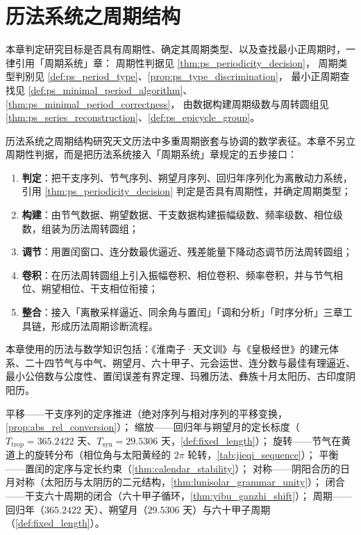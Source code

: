 \chapter{历法系统之周期结构}
\label{chap:calendar-periodic}

\begin{remark}[本章目标的周期性判定（引用）]\label{rem:calendar_ps_hook}
本章判定研究目标是否具有周期性、确定其周期类型、以及查找最小正周期时，一律引用「周期系统」章：
周期性判据见 \cref{thm:ps_periodicity_decision}，
周期类型判别见 \cref{def:ps_period_type}、\cref{prop:ps_type_discrimination}，
最小正周期查找见 \cref{def:ps_minimal_period_algorithm}、\cref{thm:ps_minimal_period_correctness}，
由数据构建周期级数与周转圆组见 \cref{thm:ps_series_reconstruction}、\cref{def:ps_epicycle_group}。
\end{remark}

\begin{remark}\label{rem:calendar_chapter_positioning}
历法系统之周期结构研究天文历法中多重周期嵌套与协调的数学表征。本章不另立周期性判据，而是把历法系统接入「周期系统」章规定的五步接口：
\begin{enumerate}[label=(\arabic*)]
    \item \textbf{判定}：把干支序列、节气序列、朔望月序列、回归年序列化为离散动力系统，引用 \cref{thm:ps_periodicity_decision} 判定是否具有周期性，并确定周期类型；
    \item \textbf{构建}：由节气数据、朔望数据、干支数据构建振幅级数、频率级数、相位级数，组装为历法周转圆组；
    \item \textbf{调节}：用置闰窗口、连分数最优逼近、残差能量下降动态调节历法周转圆组；
    \item \textbf{卷积}：在历法周转圆组上引入振幅卷积、相位卷积、频率卷积，并与节气相位、朔望相位、干支相位衔接；
    \item \textbf{整合}：接入「离散采样逼近、同余角与置闰」「调和分析」「时序分析」三章工具链，形成历法周期诊断流程。
\end{enumerate}
本章使用的历法与数学知识包括：《淮南子·天文训》与《皇极经世》的建元体系、二十四节气与中气、朔望月、六十甲子、元会运世、连分数与最佳有理逼近、最小公倍数与公度性、置闰误差有界定理、玛雅历法、彝族十月太阳历、古印度阴阳历。
\end{remark}

\begin{remark}[本章七主题导引]\label{rem:calendar_seven_themes}
平移——干支序列的定序推进（绝对序列与相对序列的平移变换，\cref{prop:abs_rel_conversion}）；
缩放——回归年与朔望月的定长标度（\(T_{\text{trop}}=365.2422\) 天、\(T_{\text{syn}}=29.5306\) 天，\cref{def:fixed_length}）；
旋转——节气在黄道上的旋转分布（相位角与太阳黄经的 \(2\pi\) 轮转，\cref{tab:jieqi_sequence}）；
平衡——置闰的定序与定长约束（\cref{thm:calendar_stability}）；
对称——阴阳合历的日月对称（太阳历与太阴历的二元结构，\cref{thm:lunisolar_grammar_unity}）；
闭合——干支六十周期的闭合（六十甲子循环，\cref{thm:yibu_ganzhi_shift}）；
周期——回归年（\(365.2422\) 天）、朔望月（\(29.5306\) 天）与六十甲子周期（\cref{def:fixed_length}）。
\end{remark}

